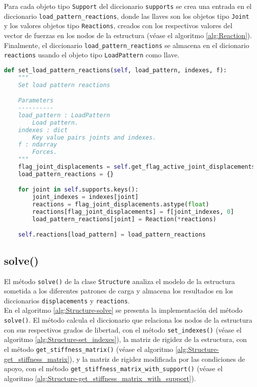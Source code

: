 Para cada objeto tipo \verb|Support| del diccionario \verb|supports| se crea una entrada en el diccionario \verb|load_pattern_reactions|, donde las llaves son los objetos tipo \verb|Joint| y los valores objetos tipo \verb|Reactions|, creados con los respectivos valores del vector de fuerzas en los nodos de la estructura (véase el algoritmo \ref{alg:Reaction}).\\

Finalmente, el diccionario \verb|load_pattern_reactions| se almacena en el dicionario \verb|reactions| usando el objeto tipo \verb|LoadPattern| como llave.\\

\begin{lstlisting}[language=Python,caption=Método \texttt{set\_load\_pattern\_reactions()} de la clase \texttt{Structure}.,label=alg:Structure-set_load_pattern_reactions, frame=single]
def set_load_pattern_reactions(self, load_pattern, indexes, f):
    """
    Set load pattern reactions

    Parameters
    ----------
    load_pattern : LoadPattern
        Load pattern.
    indexes : dict
        Key value pairs joints and indexes.
    f : ndarray
        Forces.
    """
    flag_joint_displacements = self.get_flag_active_joint_displacements()
    load_pattern_reactions = {}

    for joint in self.supports.keys():
        joint_indexes = indexes[joint]
        reactions = flag_joint_displacements.astype(float)
        reactions[flag_joint_displacements] = f[joint_indexes, 0]
        load_pattern_reactions[joint] = Reaction(*reactions)

    self.reactions[load_pattern] = load_pattern_reactions
\end{lstlisting}

\subsection{solve()}

El método \verb|solve()| de la clase \verb|Structure| analiza el modelo de la estructura sometida a los diferentes patrones de carga y almacena los resultados en los diccionarios \verb|displacements| y \verb|reactions|.\\ 

En el algoritmo \ref{alg:Structure-solve} se presenta la implementación del método \verb|solve()|. El método calcula el diccionario que relaciona los nodos de la estructura con sus respectivos grados de libertad, con el método \verb|set_indexes()| (véase el algoritmo \ref{alg:Structure-set_indexes}), la matriz de rigidez de la estructura, con el método \verb|get_stiffness_matrix()| (véase el algoritmo \ref{alg:Structure-get_stiffness_matrix}), y la matriz de rigidez modificada por las condiciones de apoyo, con el método \verb|get_stiffness_matrix_with_support()| (véase el algoritmo \ref{alg:Structure-get_stiffness_matrix_with_support}).\\


